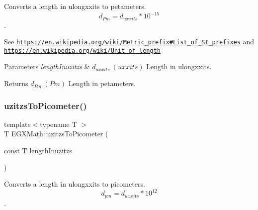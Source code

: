 Converts a length in ulongxxits to petameters. \[ d_{Pm}=d_{uxxits} * 10^{-15} \]. 

See \href{https://en.wikipedia.org/wiki/Metric_prefix#List_of_SI_prefixes}{\tt https\+://en.\+wikipedia.\+org/wiki/\+Metric\+\_\+prefix\#\+List\+\_\+of\+\_\+\+S\+I\+\_\+prefixes} and \href{https://en.wikipedia.org/wiki/Unit_of_length}{\tt https\+://en.\+wikipedia.\+org/wiki/\+Unit\+\_\+of\+\_\+length} 
\begin{DoxyParams}{Parameters}
{\em length\+Inuzitzs} & $ d_{uxxits}\ (uxxits)$ Length in ulongxxits. \\
\hline
\end{DoxyParams}
\begin{DoxyReturn}{Returns}
$ d_{Pm}\ (Pm)$ Length in petameters. 
\end{DoxyReturn}
\mbox{\label{group___e_g_x_math-_conversions-_length_conversions-uzitzs-_s_i_ga48c60a4876ac426d1717096263648a4d}} 
\subsubsection{\texorpdfstring{uzitzs\+To\+Picometer()}{uzitzsToPicometer()}}
{\footnotesize\ttfamily template$<$typename T $>$ \\
T E\+G\+X\+Math\+::uzitzs\+To\+Picometer (\begin{DoxyParamCaption}\item[{const T}]{length\+Inuzitzs }\end{DoxyParamCaption})}



Converts a length in ulongxxits to picometers. \[ d_{pm}=d_{uxxits} * 10^{12} \]. 

